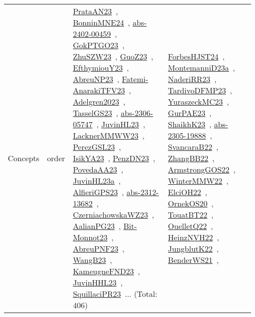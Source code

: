 {\begin{longtable}{lp{3cm}>{\raggedright\arraybackslash}p{6cm}>{\raggedright\arraybackslash}p{6cm}>{\raggedright\arraybackslash}p{8cm}}
Concepts & order & \href{../works/PrataAN23.pdf}{PrataAN23}~\cite{PrataAN23}, \href{../works/BonninMNE24.pdf}{BonninMNE24}~\cite{BonninMNE24}, \href{../works/abs-2402-00459.pdf}{abs-2402-00459}~\cite{abs-2402-00459}, \href{../works/GokPTGO23.pdf}{GokPTGO23}~\cite{GokPTGO23}, \href{../works/ZhuSZW23.pdf}{ZhuSZW23}~\cite{ZhuSZW23}, \href{../works/GuoZ23.pdf}{GuoZ23}~\cite{GuoZ23}, \href{../works/EfthymiouY23.pdf}{EfthymiouY23}~\cite{EfthymiouY23}, \href{../works/AbreuNP23.pdf}{AbreuNP23}~\cite{AbreuNP23}, \href{../works/Fatemi-AnarakiTFV23.pdf}{Fatemi-AnarakiTFV23}~\cite{Fatemi-AnarakiTFV23}, \href{../works/Adelgren2023.pdf}{Adelgren2023}~\cite{Adelgren2023}, \href{../works/TasselGS23.pdf}{TasselGS23}~\cite{TasselGS23}, \href{../works/abs-2306-05747.pdf}{abs-2306-05747}~\cite{abs-2306-05747}, \href{../works/JuvinHL23.pdf}{JuvinHL23}~\cite{JuvinHL23}, \href{../works/LacknerMMWW23.pdf}{LacknerMMWW23}~\cite{LacknerMMWW23}, \href{../works/PerezGSL23.pdf}{PerezGSL23}~\cite{PerezGSL23}, \href{../works/IsikYA23.pdf}{IsikYA23}~\cite{IsikYA23}, \href{../works/PenzDN23.pdf}{PenzDN23}~\cite{PenzDN23}, \href{../works/PovedaAA23.pdf}{PovedaAA23}~\cite{PovedaAA23}, \href{../works/JuvinHL23a.pdf}{JuvinHL23a}~\cite{JuvinHL23a}, \href{../works/AlfieriGPS23.pdf}{AlfieriGPS23}~\cite{AlfieriGPS23}, \href{../works/abs-2312-13682.pdf}{abs-2312-13682}~\cite{abs-2312-13682}, \href{../works/CzerniachowskaWZ23.pdf}{CzerniachowskaWZ23}~\cite{CzerniachowskaWZ23}, \href{../works/AalianPG23.pdf}{AalianPG23}~\cite{AalianPG23}, \href{../works/Bit-Monnot23.pdf}{Bit-Monnot23}~\cite{Bit-Monnot23}, \href{../works/AbreuPNF23.pdf}{AbreuPNF23}~\cite{AbreuPNF23}, \href{../works/WangB23.pdf}{WangB23}~\cite{WangB23}, \href{../works/KameugneFND23.pdf}{KameugneFND23}~\cite{KameugneFND23}, \href{../works/JuvinHHL23.pdf}{JuvinHHL23}~\cite{JuvinHHL23}, \href{../works/SquillaciPR23.pdf}{SquillaciPR23}~\cite{SquillaciPR23}... (Total: 406) & \href{../works/ForbesHJST24.pdf}{ForbesHJST24}~\cite{ForbesHJST24}, \href{../works/MontemanniD23a.pdf}{MontemanniD23a}~\cite{MontemanniD23a}, \href{../works/NaderiRR23.pdf}{NaderiRR23}~\cite{NaderiRR23}, \href{../works/TardivoDFMP23.pdf}{TardivoDFMP23}~\cite{TardivoDFMP23}, \href{../works/YuraszeckMC23.pdf}{YuraszeckMC23}~\cite{YuraszeckMC23}, \href{../works/GurPAE23.pdf}{GurPAE23}~\cite{GurPAE23}, \href{../works/ShaikhK23.pdf}{ShaikhK23}~\cite{ShaikhK23}, \href{../works/abs-2305-19888.pdf}{abs-2305-19888}~\cite{abs-2305-19888}, \href{../works/SvancaraB22.pdf}{SvancaraB22}~\cite{SvancaraB22}, \href{../works/ZhangBB22.pdf}{ZhangBB22}~\cite{ZhangBB22}, \href{../works/ArmstrongGOS22.pdf}{ArmstrongGOS22}~\cite{ArmstrongGOS22}, \href{../works/WinterMMW22.pdf}{WinterMMW22}~\cite{WinterMMW22}, \href{../works/ElciOH22.pdf}{ElciOH22}~\cite{ElciOH22}, \href{../works/OrnekOS20.pdf}{OrnekOS20}~\cite{OrnekOS20}, \href{../works/TouatBT22.pdf}{TouatBT22}~\cite{TouatBT22}, \href{../works/OuelletQ22.pdf}{OuelletQ22}~\cite{OuelletQ22}, \href{../works/HeinzNVH22.pdf}{HeinzNVH22}~\cite{HeinzNVH22}, \href{../works/JungblutK22.pdf}{JungblutK22}~\cite{JungblutK22}, \href{../works/BenderWS21.pdf}{BenderWS21}~\cite{BenderWS21}, 
\end{longtable}}
